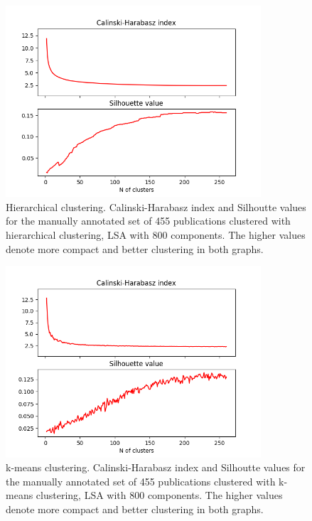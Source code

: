 \begin{figure}[ht]
  \begin{center}    
\includegraphics[width=9.5cm]{images/c-h-silh-index-plot-519-2_260-800-hierarchical.png}
    \caption{Hierarchical clustering. Calinski-Harabasz index and Silhoutte values for the
    manually annotated set of 455 publications clustered with hierarchical
    clustering, LSA with 800 components. The higher values denote 
    more compact and better clustering in both graphs.}
    \label{fig:ch-silh01}
  \end{center}
\end{figure}


\begin{figure}[ht]
  \begin{center}    
\includegraphics[width=9.5cm]{images/c-h-silh-index-plot-519-2_260-800-kmeans.png}
    \caption{k-means clustering. Calinski-Harabasz index and Silhoutte values for the
    manually annotated set of 455 publications clustered with k-means 
    clustering, LSA with 800 components. The higher values denote 
    more compact and better clustering in both graphs.}
    \label{fig:ch-silh02}
  \end{center}
\end{figure}


